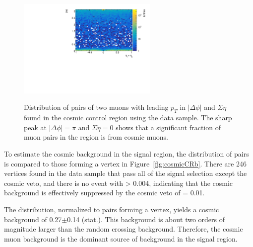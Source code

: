 \begin{figure}[!htb]
    \begin{center}
    \includegraphics[width=0.6\textwidth]{figures/Cosmics/DataValidation/mup_seta_dphi.pdf}
    \label{fig:cosmicData}
    \caption{Distribution of pairs of two muons with leading $p_{T}$ in $|\Delta \phi|$ and $\Sigma \eta$ found in the cosmic control region using the data sample. The sharp peak at $|\Delta\phi| = \pi$ and $\Sigma \eta = 0$ shows that a significant fraction of muon pairs in the region is from cosmic muons.}
\end{center}
\end{figure}

To estimate the cosmic background in the signal region, the \Rcr distribution of \mumu pairs is compared to those forming a vertex in Figure~\ref{fig:cosmicCRb}. There are 246 \mumu vertices found in the data sample that pass all of the signal selection except the cosmic veto, and there is no event with \Rcr > 0.004, indicating that the cosmic background is effectively suppressed by the cosmic veto of \Rcr = 0.01.

The \Rcr distribution, normalized to \mumu pairs forming a vertex, yields a cosmic background of 0.27$\pm$0.14 (stat.). This background is about two orders of magnitude larger than the random crossing background. Therefore, the cosmic muon background is the dominant source of background in the signal region.


